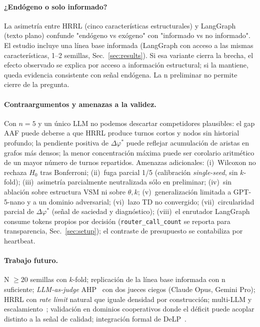 \documentclass{llncs}
\begin{document}
\paragraph{¿End\'ogeno o solo informado?}
La asimetr\'ia entre HRRL (cinco caracter\'isticas estructurales) y
LangGraph (texto plano) confunde "end\'ogeno vs ex\'ogeno" con
"informado vs no informado". El estudio incluye una l\'inea base
informada (LangGraph con acceso a las mismas caracter\'isticas, 1--2
semillas, Sec.~\ref{sec:results}). Si esa variante cierra la brecha,
el efecto observado se explica por acceso a informaci\'on estructural;
si la mantiene, queda evidencia consistente con se\~nal end\'ogena.
La n preliminar no permite cierre de la pregunta.

\paragraph{Contraargumentos y amenazas a la validez.}
Con $n{=}5$ y un \'unico LLM no podemos descartar competidores
plausibles: el gap AAF puede deberse a que HRRL produce turnos cortos
y nodos sin historial profundo; la pendiente positiva de
$\Delta\varphi^*$ puede reflejar acumulaci\'on de aristas en grafos
m\'as densos; la menor concentraci\'on m\'axima puede ser corolario
aritm\'etico de un mayor n\'umero de turnos repartidos. Amenazas
adicionales: (i)~Wilcoxon no rechaza $H_0$ tras Bonferroni;
(ii)~fuga parcial 1/5 (calibraci\'on \emph{single-seed}, sin
$k$-fold); (iii)~asimetr\'ia parcialmente neutralizada s\'olo en
preliminar; (iv)~sin ablaci\'on sobre estructura VSM ni sobre
$\theta,k$; (v)~generalizaci\'on limitada a GPT-5-nano y a un dominio
adversarial; (vi)~lazo TD no convergido; (vii)~circularidad parcial
de $\Delta\varphi^*$ (se\~nal de saciedad y diagn\'ostico);
(viii)~el enrutador LangGraph consume tokens propios por decisi\'on
(\texttt{router\_call\_count} se reporta para transparencia,
Sec.~\ref{sec:setup}); el contraste de presupuesto se contabiliza
por heartbeat.

\paragraph{Trabajo futuro.}
N $\geq 20$ semillas con $k$-fold; replicaci\'on de la l\'inea base
informada con n suficiente; \emph{LLM-as-judge} AHP~\parencite{lu2024ahp}
con dos jueces ciegos (Claude Opus, Gemini Pro); HRRL con \emph{rate
limit} natural que iguale densidad por construcci\'on; multi-LLM y
escalamiento~\parencite{snell2024scaling}; validaci\'on en dominios
cooperativos donde el d\'eficit puede acoplar distinto a la se\~nal
de calidad; integraci\'on formal de
DeLP~\parencite{garcia2004defeasible}.
\end{document}
